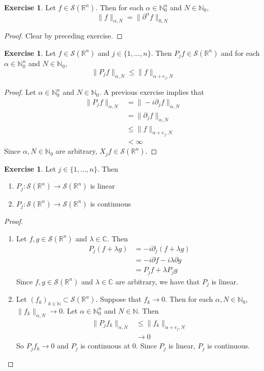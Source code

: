 \documentclass[12pt]{amsart}
\theoremstyle{definition}
\newtheorem{ex}[definition]{Exercise}
\newcommand{\p}{\partial}
\newcommand{\al}{\alpha}
\newcommand{\lam}{\lambda}
\newcommand{\C}{\mathbb{C}}
\newcommand{\N}{\mathbb{N}}
\newcommand{\R}{\mathbb{R}}
\newcommand{\MS}{\mathcal{S}}
\begin{document}
	\begin{ex}
		Let $f \in \MS(\R^n)$. Then for each $\al\in \N_0^n$ and $N \in \N_0$, 
		$$\|f\|_{\al, N} = \|\p^{\al} f\|_{0, N}$$
	\end{ex}
	
	\begin{proof}
		Clear by preceding exercise.
	\end{proof}

	\begin{ex}
		Let $f \in \MS(\R^n)$ and $j \in \{1, \ldots, n\}$. Then $P_jf \in \MS(\R^n)$ and for each $\al \in \N_0^n$ and $N \in \N_0$, 
		\[
		\|P_jf \|_{\al, N} \leq \|f\|_{\al + e_j, N}
		\] 
	\end{ex}
	
	\begin{proof}
		Let $\al  \in \N_0^n$ and $N \in \N_0$. A previous exercise implies that  
		\begin{align*}
			\|P_j f\|_{\al, N} 
			& = \|- i \p_j f \|_{\al, N} \\
			& = \| \p_j f \|_{\al, N} \\
			& \leq \|f\|_{\al+ e_j, N} \\
			& < \infty 
		\end{align*}
		Since $\al, N \in \N_0$ are arbitrary, $X_jf \in \MS(\R^n)$.
	\end{proof}

	\begin{ex}
		Let $j \in \{1, \ldots, n\}$. Then 
		\begin{enumerate}
			\item $P_j: \MS(\R^n) \rightarrow \MS(\R^n)$ is linear
			\item $P_j: \MS(\R^n) \rightarrow \MS(\R^n)$ is continuous
		\end{enumerate}
	\end{ex}
	
	\begin{proof}\
		\begin{enumerate}
			\item Let $f, g \in \MS(\R^n)$ and $\lam \in \C$. Then 
			\begin{align*}
				P_j(f + \lam g) 
				& = -i\p_j (f + \lam g) \\
				& = -i \p f -i\lam \p g  \\
				& = P_jf + \lam P_jg 
			\end{align*} 
			Since $f, g \in \MS(\R^n)$ and $\lam \in \C$ are arbitrary, we have that $P_j$ is linear.
			\item Let $(f_k)_{k \in \N} \subset \MS(\R^n)$. Suppose that $f_k \rightarrow 0$. Then for each $\al, N \in \N_0$, $\|f_k\|_{\al, N} \rightarrow 0$. Let $\al \in \N_0^n$ and $N \in \N$. Then
			\begin{align*}
				\|P_jf_k\|_{\al, N} 
				& \leq \|f_k \|_{\al + e_j, N} \\
				& \rightarrow 0
			\end{align*}
			So $P_jf_k \rightarrow 0$ and $P_j$ is continuous at $0$. Since $P_j$ is linear, $P_j$ is continuous. 
		\end{enumerate}
	\end{proof}
\end{document}
